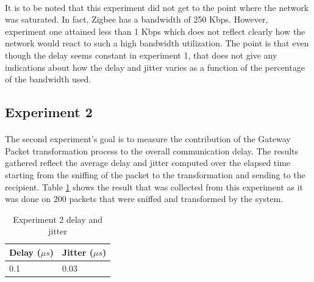 \documentclass[oneside,12pt,a4paper,final]{book}
\begin{document}
 \paragraph{}
 It is to be noted that this experiment did not get to the point where the network was saturated. In fact, Zigbee has a bandwidth of 250 Kbps. However, experiment one attained less than 1 Kbps which does not reflect clearly how the network would react to such a high bandwidth utilization. The point is that even though the delay seems constant in experiment 1, that does not give any indications about how the delay and jitter varies as a function of the percentage of the bandwidth used.
 
\subsection{Experiment 2}
\paragraph{}
The second experiment's goal is to measure the contribution of the Gateway Packet transformation process to the overall communication delay. The results gathered reflect the average delay and jitter computed over the elapsed time starting from the sniffing of the packet to the transformation and sending to the recipient. Table \ref{table:exp2} shows the result that was collected from this experiment as it was done on 200 packets that were sniffed and transformed by the system.

\begin{table}[htbp]
    \begin{tabular}{ll}
    \hline
    Delay ($\mu s$) & Jitter ($\mu s$) \\ \hline
    0.1        & 0.03         \\ 
    \end{tabular}
    \caption{Experiment 2 delay and jitter}
        \label{table:exp2}
\end{table}
\end{document}
